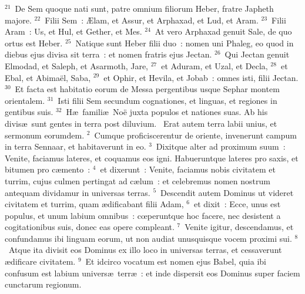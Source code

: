 ${}^{21}$~De Sem quoque nati sunt, patre omnium filiorum Heber, fratre Japheth majore.
${}^{22}$~Filii Sem~: \AE lam, et Assur, et Arphaxad, et Lud, et Aram.
${}^{23}$~Filii Aram~: Us, et Hul, et Gether, et Mes.
${}^{24}$~At vero Arphaxad genuit Sale, de quo ortus est Heber.
${}^{25}$~Natique sunt Heber filii duo~: nomen uni Phaleg, eo quod in diebus ejus divisa sit terra~: et nomen fratris ejus Jectan.
${}^{26}$~Qui Jectan genuit Elmodad, et Saleph, et Asarmoth, Jare,
${}^{27}$~et Aduram, et Uzal, et Decla,
${}^{28}$~et Ebal, et Abima\"el, Saba,
${}^{29}$~et Ophir, et Hevila, et Jobab~: omnes isti, filii Jectan.
${}^{30}$~Et facta est habitatio eorum de Messa pergentibus usque Sephar montem orientalem.
${}^{31}$~Isti filii Sem secundum cognationes, et linguas, et regiones in gentibus suis.
${}^{32}$~H\ae\ famili\ae\ No\"e juxta populos et nationes suas. Ab his divis\ae\ sunt gentes in terra post diluvium.
~Erat autem terra labii unius, et sermonum eorumdem.
${}^{2}$~Cumque proficiscerentur de oriente, invenerunt campum in terra Sennaar, et habitaverunt in eo.
${}^{3}$~Dixitque alter ad proximum suum~: Venite, faciamus lateres, et coquamus eos igni. Habueruntque lateres pro saxis, et bitumen pro c\ae mento~:
${}^{4}$~et dixerunt~: Venite, faciamus nobis civitatem et turrim, cujus culmen pertingat ad c\ae lum~: et celebremus nomen nostrum antequam dividamur in universas terras.
${}^{5}$~Descendit autem Dominus ut videret civitatem et turrim, quam \ae dificabant filii Adam,
${}^{6}$~et dixit~: Ecce, unus est populus, et unum labium omnibus~: cœperuntque hoc facere, nec desistent a cogitationibus suis, donec eas opere compleant.
${}^{7}$~Venite igitur, descendamus, et confundamus ibi linguam eorum, ut non audiat unusquisque vocem proximi sui.
${}^{8}$~Atque ita divisit eos Dominus ex illo loco in universas terras, et cessaverunt \ae dificare civitatem.
${}^{9}$~Et idcirco vocatum est nomen ejus Babel, quia ibi confusum est labium univers\ae\ terr\ae~: et inde dispersit eos Dominus super faciem cunctarum regionum.


